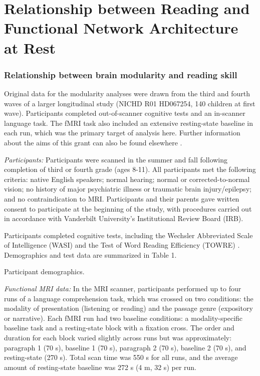 \chapter{Relationship between Reading and Functional Network Architecture at Rest}




\subsection{Relationship between brain modularity and reading skill}
Original data for the modularity analyses were drawn from the third and fourth waves of a larger longitudinal study (NICHD R01 HD067254, 140 children at first wave). Participants completed out-of-scanner cognitive tests and an in-scanner language task. The fMRI task also included an extensive resting-state baseline in each run, which was the primary target of analysis here. Further information about the aims of this grant can also be found elsewhere \cite{Aboud2016, Wendelken2017}.

\emph{Participants:} Participants were scanned in the summer and fall following completion of third or fourth grade (ages 8-11). All participants met the following criteria: native English speakers; normal hearing; normal or corrected-to-normal vision; no history of major psychiatric illness or traumatic brain injury/epilepsy; and no contraindication to MRI. Participants and their parents gave written consent to participate at the beginning of the study, with procedures carried out in accordance with Vanderbilt University’s Institutional Review Board (IRB). 

Participants completed cognitive tests, including the Wechsler Abbreviated Scale of Intelligence (WASI) \cite{Kaplan1999} and the Test of Word Reading Efficiency (TOWRE) \cite{Torgesen2012}. Demographics and test data are summarized in Table 1. 

\begin{table}
\scriptsize
\renewcommand{\tabcolsep}{0.09cm}
\centering

\caption{Participant demographics.}
\label{table:Ch4_Participants}
\end{table}

\emph{Functional MRI data:} In the MRI scanner, participants performed up to four runs of a language comprehension task, which was crossed on two conditions: the modality of presentation (listening or reading) and the passage genre (expository or narrative).  Each fMRI run had two baseline conditions: a modality-specific baseline task and a resting-state block with a fixation cross. The order and duration for each block varied slightly across runs but was approximately: paragraph 1 (70 s), baseline 1 (70 s), paragraph 2 (70 s), baseline 2 (70 s), and resting-state (270 s). Total scan time was 550 s for all runs, and the average amount of resting-state baseline was 272 s (4 m, 32 s) per run.

